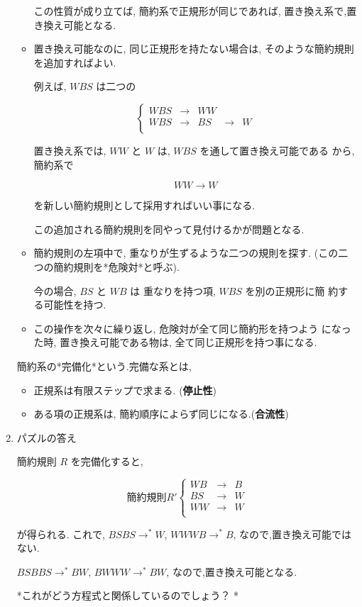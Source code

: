\documentclass[a4j]{jarticle}
\begin{document}
\begin{enumerate}
\begin{itemize}
この性質が成り立てば, 簡約系で正規形が同じであれば,
置き換え系で,置き換え可能となる.

\item 置き換え可能なのに, 同じ正規形を持たない場合は,
そのような簡約規則を追加すればよい.

例えば, \(WBS\) は二つの

$$\left\{ \begin{array}{rllll}
   WBS & \rightarrow  &  WW\\
   WBS & \rightarrow   & BS & \rightarrow  & W\\
         \end{array}
   \right.$$

置き換え系では, \(WW\) と \(W\) は, \(WBS\) を通して置き換え可能である
から, 簡約系で

$$WW  \rightarrow   W$$

を新しい簡約規則として採用すればいい事になる.

この追加される簡約規則を同やって見付けるかが問題となる.

\item 簡約規則の左項中で, 重なりが生ずるような二つの規則を探す.
(この二つの簡約規則を*危険対*と呼ぶ).

今の場合, \(BS\) と \(WB\) は 重なりを持つ項, \(WBS\) を別の正規形に簡
約する可能性を持つ.

\item この操作を次々に繰り返し, 危険対が全て同じ簡約形を持つよう
になった時, 置き換え可能である物は, 全て同じ正規形を持つ事になる.
\end{itemize}

簡約系の*完備化*という.完備な系とは,

\begin{itemize}
\item 正規系は有限ステップで求まる. (\textbf{停止性})

\item ある項の正規系は, 簡約順序によらず同じになる.(\textbf{合流性})
\end{itemize}

\item パズルの答え
\label{sec:org7de2611}

簡約規則 \(R\) を完備化すると,

$$簡約規則 R' \left\{ \begin{array}{rll}
WB & \rightarrow  &  B\\
BS & \rightarrow   & W  \\
WW & \rightarrow   & W  \\
      \end{array}
\right.$$

が得られる. これで, \(BSBS \rightarrow^* W\), \(WWWB \rightarrow^* B\),
なので,置き換え可能ではない.

\(BSBBS \rightarrow^* BW\), \(BWWW \rightarrow^* BW\),
なので,置き換え可能となる.

*これがどう方程式と関係しているのでしょう？ *
\end{enumerate}
\end{document}
